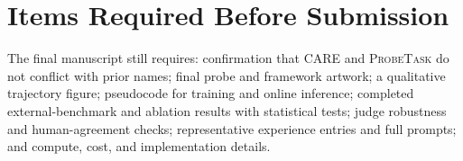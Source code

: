 \documentclass{article}
\newcommand{\method}{\textsc{CARE}}
\newcommand{\probe}{\textsc{ProbeTask}}
\begin{document}
\section{Items Required Before Submission}
\label{app:pending}

The final manuscript still requires: confirmation that \method{} and \probe{} do not conflict with prior names; final probe and framework artwork; a qualitative trajectory figure; pseudocode for training and online inference; completed external-benchmark and ablation results with statistical tests; judge robustness and human-agreement checks; representative experience entries and full prompts; and compute, cost, and implementation details.
\end{document}
